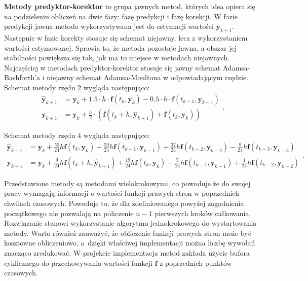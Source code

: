 \textbf{Metody predyktor-korektor} to grupa jawnych metod, których idea opiera się na podzieleniu obliczeń na dwie fazy: fazę predykcji i fazę korekcji. W fazie predykcji jawna metoda wykorzystywana jest do estymacji wartości $\bm{y}_{k+1}$. Następnie w fazie korekty stosuje się schemat niejawny, lecz z wykorzystaniem wartości estymowanej. Sprawia to, że metoda pozostaje jawna, a obszar jej stabilności powiększa się tak, jak ma to miejsce w metodach niejawnych. Najczęściej w metodach predyktor-korektor stosuje się jawny schemat Adamsa-Bashforth'a i niejawny schemat Adamsa-Moultona w odpowiadającym rzędzie. Schemat metody rzędu 2 wygląda następująco:
\[
	\begin{aligned}
	\bm{\hat{y}}_{k+1} & = \bm{y}_{k} + 1.5 \cdot h \cdot  \bm{f} \left( t_{k}, \bm{y}_{k} \right) - 0.5 \cdot h \cdot  \bm{f} \left( t_{k-1}, \bm{y}_{k-1} \right)\\
	\bm{y}_{k+1} & = \bm{y}_{k} + \frac{h}{2} \cdot  \left( \bm{f} \left( t_{k} + h, \bm{\hat{y}}_{k+1} \right) +  \bm{f} \left( t_{k}, \bm{y}_{k} \right) \right)
	\end{aligned}.
\]

Schemat metody rzędu 4 wygląda następująco:
\[
	\begin{aligned}
	\bm{\hat{y}}_{k+1} & = \bm{y}_{k} + \frac{55}{24}  h   \bm{f} \left( t_{k}, \bm{y}_{k} \right) - \frac{59}{24}  h   \bm{f} \left( t_{k-1}, \bm{y}_{k-1} \right)  + \frac{37}{24}  h   \bm{f} \left( t_{k-2}, \bm{y}_{k-2} \right)  - \frac{9}{24}  h   \bm{f} \left( t_{k-3}, \bm{y}_{k-3} \right) \\
	\bm{y}_{k+1} & = \bm{y}_{k} +   \frac{9}{24}  h  \bm{f} \left( t_{k} + h, \bm{\hat{y}}_{k+1} \right) + \frac{19}{24}  h   \bm{f} \left( t_{k}, \bm{y}_{k} \right) - \frac{5}{24}  h   \bm{f} \left( t_{k-1}, \bm{y}_{k-1} \right)  + \frac{1}{24}  h   \bm{f} \left( t_{k-2}, \bm{y}_{k-2} \right)
	\end{aligned}.
\]

Przedstawione metody są metodami wielokrokowymi, co powoduje że do swojej pracy wymagają informacji o wartości funkcji prawych stron w poprzednich chwilach czasowych. Powoduje to, że dla zdefiniowanego powyżej zagadnienia początkowego nie pozwalają na policzenie $n-1$ pierwszych kroków całkowania. Rozwiązanie stanowi wykorzystanie algorytmu jednokrokowego do wystartowania metody. Warto również zauważyć, że obliczenie funkcji prawych stron może być kosztowne obliczeniowo, a~dzięki właściwej implementacji można liczbę wywołań znacząco zredukować. W projekcie implementacja metod zakłada użycie bufora cyklicznego do przechowywania wartości funkcji $\bm{f}$ z poprzednich punktów czasowych.

